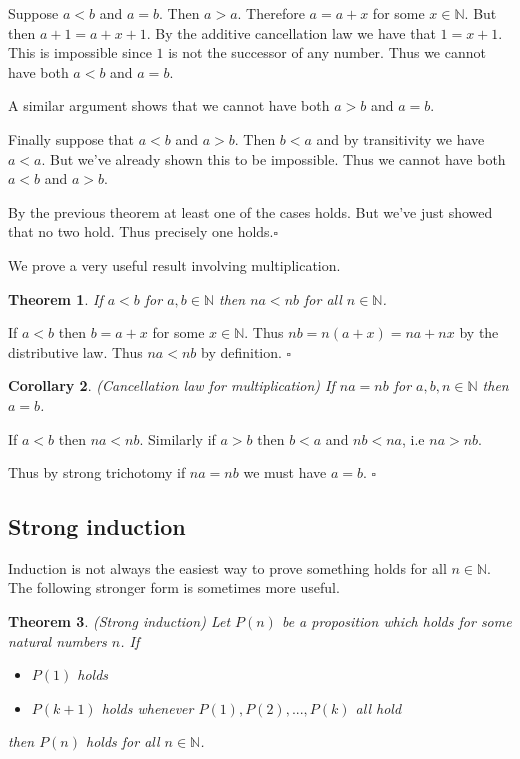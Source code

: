 \documentclass[10pt]{article}
\newcommand{\N}{\mathbb{N}}
\newcommand{\qed}{\square}
\newtheorem{theorem}{Theorem}[section]
\newtheorem{corollary}[theorem]{Corollary}
\newenvironment{proof}[1][Proof]{\begin{trivlist}
\item[\hskip \labelsep {\bfseries #1}]}{\end{trivlist}}
\begin{document}
\begin{proof}
Suppose $a < b$ and $a = b$. Then $a > a$. Therefore $a = a + x$ for some $x \in \N$. But then $a + 1 = a + x + 1$. By the additive cancellation law we have that $1 = x + 1$. This is impossible since $1$ is not the successor of any number. Thus we cannot have both $a < b$ and $a = b$.

A similar argument shows that we cannot have both $a > b$ and $a = b$.

Finally suppose that $a < b$ and $a > b$. Then $b < a$ and by transitivity we have $a < a$. But we've already shown this to be impossible. Thus we cannot have both $a < b$ and $a > b$.

By the previous theorem at least one of the cases holds. But we've just showed that no two hold. Thus precisely one holds.$\qed$
\end{proof}

We prove a very useful result involving multiplication.

\begin{theorem}
If $a < b$ for $a, b \in \N$ then $na < nb$ for all $n \in \N$.
\end{theorem}

\begin{proof}
If $a < b$ then $b = a + x$ for some $x \in \N$. Thus $nb = n(a + x) = na + nx$ by the distributive law. Thus $na < nb$ by definition. $\qed$
\end{proof}

\begin{corollary} (Cancellation law for multiplication)
If $na = nb$ for $a, b, n \in \N$ then $a = b$.
\end{corollary}

\begin{proof}
If $a < b$ then $na < nb$. Similarly if $a > b$ then $b < a$ and $nb < na$, i.e $na > nb$.

Thus by strong trichotomy if $na = nb$ we must have $a = b$. $\qed$
\end{proof}

\subsection{Strong induction}

Induction is not always the easiest way to prove something holds for all $n \in \N$. The following stronger form is sometimes more useful.

\begin{theorem} (Strong induction)
Let $P(n)$ be a proposition which holds for some natural numbers $n$. If
\begin{itemize}
\item $P(1)$ holds
\item $P(k + 1)$ holds whenever $P(1), P(2), ..., P(k)$ all hold
\end{itemize}
then $P(n)$ holds for all $n \in \N$.
\end{theorem}
\end{document}
